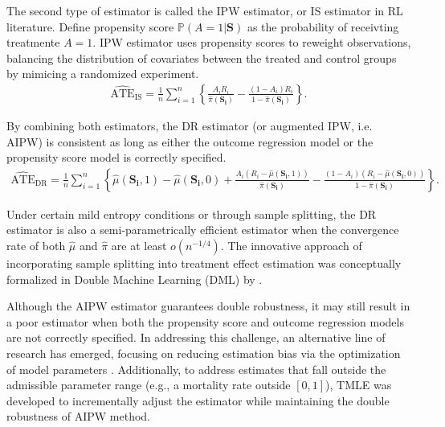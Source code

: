 The second type of estimator is called the \acrfull{IPW} estimator, or \acrfull{IS} estimator in \acrshort{RL} literature. Define propensity score $\mathbb{P}(A=1|\boldsymbol{S})$ as the probability of receivting treatmente $A=1$. \acrshort{IPW} estimator uses propensity scores to reweight observations, balancing the distribution of covariates between the treated and control groups by mimicing a randomized experiment.
\begin{equation} \label{eq:CEL_p1_IS}
\begin{aligned} 
\widehat{\text{ATE}}_{\text{IS}} =\frac{1}{n}\sum_{i=1}^n \left\{\frac{A_iR_i}{\hat\pi(\boldsymbol{S_i})} - \frac{(1-A_i)R_i}{1-\hat\pi(\boldsymbol{S_i})} \right\}. 
\end{aligned} 
\end{equation}

By combining both estimators, the DR estimator (or augmented \acrshort{IPW}, i.e. \acrshort{AIPW}) is consistent as long as either the outcome regression model or the propensity score model is correctly specified. 
\begin{equation} \label{eq:CEL_p1_DR}
\begin{aligned} 
\widehat{\text{ATE}}_{\text{DR}} = \frac{1}{n}\sum_{i=1}^n \left\{\hat{\mu}(\boldsymbol{S_i},1)- \hat{\mu}(\boldsymbol{S_i},0)+\frac{A_i(R_i - \hat{\mu}(\boldsymbol{S_i},1))}{\hat{\pi}(\boldsymbol{S_i})} - \frac{(1-A_i)(R_i-\hat{\mu}(\boldsymbol{S_i},0))}{1-\hat{\pi}(\boldsymbol{S_i})} \right\}. 
\end{aligned} 
\end{equation}

Under certain mild entropy conditions or through sample splitting, the DR estimator is also a semi-parametrically efficient estimator when the convergence rate of both $\hat{\mu}$ and $\hat{\pi}$ are at least $o(n^{-1/4})$. The innovative approach of incorporating sample splitting into treatment effect estimation was conceptually formalized in Double Machine Learning (DML) by \citet{chernozhukov2018double}.

Although the \acrshort{AIPW} estimator guarantees double robustness, it may still result in a poor estimator when both the propensity score and outcome regression models are not correctly specified. In addressing this challenge, an alternative line of research has emerged, focusing on reducing estimation bias via the optimization of model parameters \citep{vermeulen2016data, yang2020doubly}. Additionally, to address estimates that fall outside the admissible parameter range (e.g., a mortality rate outside $[0,1]$), \acrfull{TMLE} \citep{gruber2010targeted, gruber2012tmle} was developed to incrementally adjust the estimator while maintaining the double robustness of \acrshort{AIPW} method.

